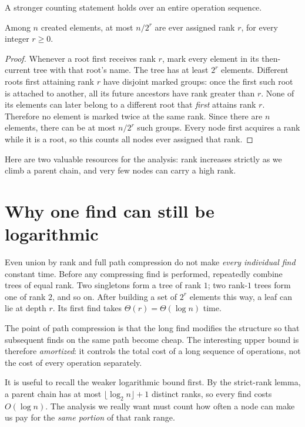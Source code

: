 A stronger counting statement holds over an entire operation sequence.

\begin{lemma}
Among \(n\) created elements, at most \(n/2^r\) are ever assigned rank \(r\), for every integer \(r\geq0\).
\label{lem:N20261108-rank-count}
\end{lemma}
\begin{proof}
Whenever a root first receives rank \(r\), mark every element in its then-current tree with that root's name. The tree has at least \(2^r\) elements. Different roots first attaining rank \(r\) have disjoint marked groups: once the first such root is attached to another, all its future ancestors have rank greater than \(r\). None of its elements can later belong to a different root that \emph{first} attains rank \(r\). Therefore no element is marked twice at the same rank. Since there are \(n\) elements, there can be at most \(n/2^r\) such groups. Every node first acquires a rank while it is a root, so this counts all nodes ever assigned that rank.
\end{proof}

Here are two valuable resources for the analysis: rank increases strictly as we climb a parent chain, and very few nodes can carry a high rank.

\section{Why one find can still be logarithmic}

Even union by rank and full path compression do not make \emph{every individual find} constant time. Before any compressing find is performed, repeatedly combine trees of equal rank. Two singletons form a tree of rank \(1\); two rank-\(1\) trees form one of rank \(2\), and so on. After building a set of \(2^r\) elements this way, a leaf can lie at depth \(r\). Its first find takes \(\Theta(r)=\Theta(\log n)\) time.

The point of path compression is that the long find modifies the structure so that subsequent finds on the same path become cheap. The interesting upper bound is therefore \emph{amortized}: it controls the total cost of a long sequence of operations, not the cost of every operation separately.

It is useful to recall the weaker logarithmic bound first. By the strict-rank lemma, a parent chain has at most \(\lfloor\log_2n\rfloor+1\) distinct ranks, so every find costs \(O(\log n)\). The analysis we really want must count how often a node can make us pay for the \emph{same portion} of that rank range.

